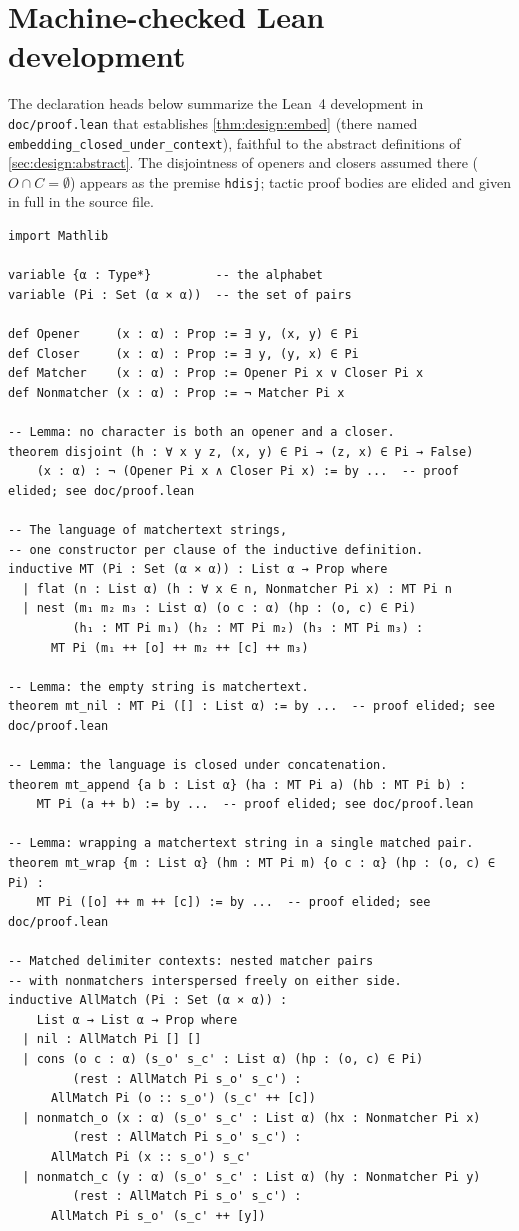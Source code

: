 \section{Machine-checked Lean development}
\label{app:lean}

The declaration heads below summarize the Lean~4 development in
\texttt{doc/proof.lean} that establishes \cref{thm:design:embed}
(there named \texttt{embedding\_closed\_under\_context}),
faithful to the abstract definitions of \cref{sec:design:abstract}.
The disjointness of openers and closers assumed there ($O \cap C = \emptyset$)
appears as the premise \texttt{hdisj};
tactic proof bodies are elided and given in full in the source file.

\begin{lstlisting}
import Mathlib

variable {α : Type*}         -- the alphabet
variable (Pi : Set (α × α))  -- the set of pairs

def Opener     (x : α) : Prop := ∃ y, (x, y) ∈ Pi
def Closer     (x : α) : Prop := ∃ y, (y, x) ∈ Pi
def Matcher    (x : α) : Prop := Opener Pi x ∨ Closer Pi x
def Nonmatcher (x : α) : Prop := ¬ Matcher Pi x

-- Lemma: no character is both an opener and a closer.
theorem disjoint (h : ∀ x y z, (x, y) ∈ Pi → (z, x) ∈ Pi → False)
    (x : α) : ¬ (Opener Pi x ∧ Closer Pi x) := by ...  -- proof elided; see doc/proof.lean

-- The language of matchertext strings,
-- one constructor per clause of the inductive definition.
inductive MT (Pi : Set (α × α)) : List α → Prop where
  | flat (n : List α) (h : ∀ x ∈ n, Nonmatcher Pi x) : MT Pi n
  | nest (m₁ m₂ m₃ : List α) (o c : α) (hp : (o, c) ∈ Pi)
         (h₁ : MT Pi m₁) (h₂ : MT Pi m₂) (h₃ : MT Pi m₃) :
      MT Pi (m₁ ++ [o] ++ m₂ ++ [c] ++ m₃)

-- Lemma: the empty string is matchertext.
theorem mt_nil : MT Pi ([] : List α) := by ...  -- proof elided; see doc/proof.lean

-- Lemma: the language is closed under concatenation.
theorem mt_append {a b : List α} (ha : MT Pi a) (hb : MT Pi b) :
    MT Pi (a ++ b) := by ...  -- proof elided; see doc/proof.lean

-- Lemma: wrapping a matchertext string in a single matched pair.
theorem mt_wrap {m : List α} (hm : MT Pi m) {o c : α} (hp : (o, c) ∈ Pi) :
    MT Pi ([o] ++ m ++ [c]) := by ...  -- proof elided; see doc/proof.lean

-- Matched delimiter contexts: nested matcher pairs
-- with nonmatchers interspersed freely on either side.
inductive AllMatch (Pi : Set (α × α)) :
    List α → List α → Prop where
  | nil : AllMatch Pi [] []
  | cons (o c : α) (s_o' s_c' : List α) (hp : (o, c) ∈ Pi)
         (rest : AllMatch Pi s_o' s_c') :
      AllMatch Pi (o :: s_o') (s_c' ++ [c])
  | nonmatch_o (x : α) (s_o' s_c' : List α) (hx : Nonmatcher Pi x)
         (rest : AllMatch Pi s_o' s_c') :
      AllMatch Pi (x :: s_o') s_c'
  | nonmatch_c (y : α) (s_o' s_c' : List α) (hy : Nonmatcher Pi y)
         (rest : AllMatch Pi s_o' s_c') :
      AllMatch Pi s_o' (s_c' ++ [y])


\end{lstlisting}
